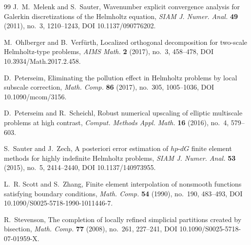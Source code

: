 \begin{thebibliography}{99}
J.~M.~Melenk and S.~Sauter,
Wavenumber explicit convergence analysis for Galerkin discretizations of
the Helmholtz equation,
\emph{SIAM J. Numer. Anal.} \textbf{49} (2011), no.~3,
1210--1243, DOI 10.1137/090776202.

M.~Ohlberger and B.~Verf\"urth,
Localized orthogonal decomposition for two-scale Helmholtz-type problems,
\emph{AIMS Math.} \textbf{2} (2017), no.~3, 458--478,
DOI 10.3934/Math.2017.2.458.

D.~Peterseim,
Eliminating the pollution effect in Helmholtz problems by local subscale
correction,
\emph{Math. Comp.} \textbf{86} (2017), no.~305, 1005--1036,
DOI 10.1090/mcom/3156.

D.~Peterseim and R.~Scheichl,
Robust numerical upscaling of elliptic multiscale problems at high contrast,
\emph{Comput. Methods Appl. Math.} \textbf{16} (2016), no.~4,
579--603.

S.~Sauter and J.~Zech,
A posteriori error estimation of $hp$-$dG$ finite element methods for
highly indefinite Helmholtz problems,
\emph{SIAM J. Numer. Anal.} \textbf{53} (2015), no.~5,
2414--2440, DOI 10.1137/140973955.

L.~R. Scott and S.~Zhang,
Finite element interpolation of nonsmooth functions satisfying boundary
conditions,
\emph{Math. Comp.} \textbf{54} (1990), no.~190, 483--493,
DOI 10.1090/S0025-5718-1990-1011446-7.

R.~Stevenson,
The completion of locally refined simplicial partitions created by
bisection,
\emph{Math. Comp.} \textbf{77} (2008), no.~261, 227--241,
DOI 10.1090/S0025-5718-07-01959-X.

\end{thebibliography}
